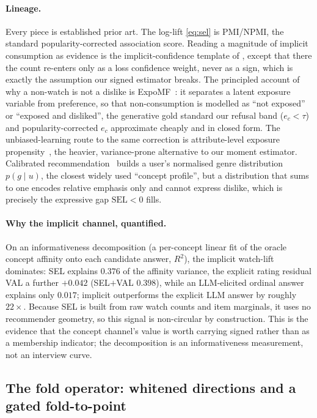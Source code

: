\documentclass[acmsmall,review,anonymous]{acmart}
\begin{document}
\paragraph{Lineage.} Every piece is established prior art. The log-lift \eqref{eq:sel} is PMI/NPMI, the standard popularity-corrected association score. Reading a magnitude of implicit consumption as evidence is the implicit-confidence template of \citet{hu2008collaborative}, except that there the count re-enters only as a loss confidence weight, never as a sign, which is exactly the assumption our signed estimator breaks. The principled account of why a non-watch is not a dislike is ExpoMF~\citep{liang2016expomf}: it separates a latent exposure variable from preference, so that non-consumption is modelled as ``not exposed'' or ``exposed and disliked'', the generative gold standard our refusal band ($e_c<\tau$) and popularity-corrected $e_c$ approximate cheaply and in closed form. The unbiased-learning route to the same correction is attribute-level exposure propensity~\citep{qin2020attributepropensity}, the heavier, variance-prone alternative to our moment estimator. Calibrated recommendation~\citep{steck2018calibrated} builds a user's normalised genre distribution $p(g\mid u)$, the closest widely used ``concept profile'', but a distribution that sums to one encodes relative emphasis only and cannot express dislike, which is precisely the expressive gap $\mathrm{SEL}<0$ fills.

\paragraph{Why the implicit channel, quantified.} On an informativeness decomposition (a per-concept linear fit of the oracle concept affinity onto each candidate answer, $R^2$), the implicit watch-lift dominates: SEL explains $0.376$ of the affinity variance, the explicit rating residual VAL a further $+0.042$ (SEL$+$VAL $0.398$), while an LLM-elicited ordinal answer explains only $0.017$; implicit outperforms the explicit LLM answer by roughly $22\times$. Because SEL is built from raw watch counts and item marginals, it uses no recommender geometry, so this signal is non-circular by construction. This is the evidence that the concept channel's value is worth carrying signed rather than as a membership indicator; the decomposition is an informativeness measurement, not an interview curve.

\subsection{The fold operator: whitened directions and a gated fold-to-point}\label{sec:concept:fold}
\end{document}

